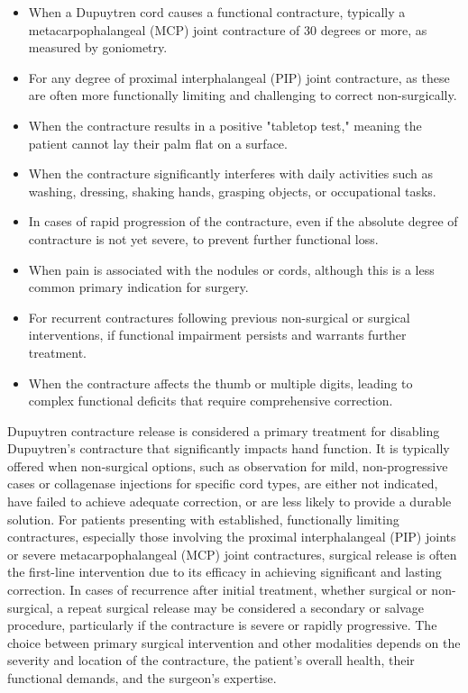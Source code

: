 \begin{itemize}
  \item When a Dupuytren cord causes a functional contracture, typically a metacarpophalangeal (MCP) joint contracture of 30 degrees or more, as measured by goniometry.
  \item For any degree of proximal interphalangeal (PIP) joint contracture, as these are often more functionally limiting and challenging to correct non-surgically.
  \item When the contracture results in a positive "tabletop test," meaning the patient cannot lay their palm flat on a surface.
  \item When the contracture significantly interferes with daily activities such as washing, dressing, shaking hands, grasping objects, or occupational tasks.
  \item In cases of rapid progression of the contracture, even if the absolute degree of contracture is not yet severe, to prevent further functional loss.
  \item When pain is associated with the nodules or cords, although this is a less common primary indication for surgery.
  \item For recurrent contractures following previous non-surgical or surgical interventions, if functional impairment persists and warrants further treatment.
  \item When the contracture affects the thumb or multiple digits, leading to complex functional deficits that require comprehensive correction.
\end{itemize}

Dupuytren contracture release is considered a primary treatment for disabling Dupuytren's contracture that significantly impacts hand function. It is typically offered when non-surgical options, such as observation for mild, non-progressive cases or collagenase injections for specific cord types, are either not indicated, have failed to achieve adequate correction, or are less likely to provide a durable solution. For patients presenting with established, functionally limiting contractures, especially those involving the proximal interphalangeal (PIP) joints or severe metacarpophalangeal (MCP) joint contractures, surgical release is often the first-line intervention due to its efficacy in achieving significant and lasting correction. In cases of recurrence after initial treatment, whether surgical or non-surgical, a repeat surgical release may be considered a secondary or salvage procedure, particularly if the contracture is severe or rapidly progressive. The choice between primary surgical intervention and other modalities depends on the severity and location of the contracture, the patient's overall health, their functional demands, and the surgeon's expertise.

